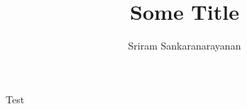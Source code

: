 \documentclass[one column,a4paper]{article}
\title{\Huge Some Title}
\author[1]{Sriram Sankaranarayanan}
\affil[1]{Department of Mathematics and Industrial Engineering, Polytechnique Montr\'{e}al}
\date{}
\theoremstyle{definition}
\begin{document}
\maketitle

Test
% 
% 
\end{document}
